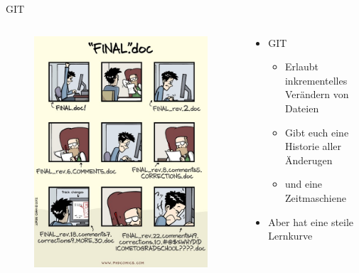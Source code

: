 \begin{frame}{GIT}
    \begin{columns}
        \begin{column}{0.4\textwidth}
            \begin{flushleft}
                \begin{figure}
                    \includegraphics[height=0.8\textheight]{graphics/final.jpg}
                \end{figure}    
            \end{flushleft}            
        \end{column}
        \begin{column}[t]{0.6\textwidth}
            \pause
            \vspace{-4cm}
            \begin{itemize}[]
                \item GIT
                \begin{itemize}
                    \item Erlaubt inkrementelles Verändern von Dateien
                    \item Gibt euch eine Historie aller Änderugen
                    \item und eine Zeitmaschiene
                \end{itemize}
                \item Aber hat eine steile Lernkurve
            \end{itemize}
            
        \end{column}
    \end{columns}
\end{frame}
